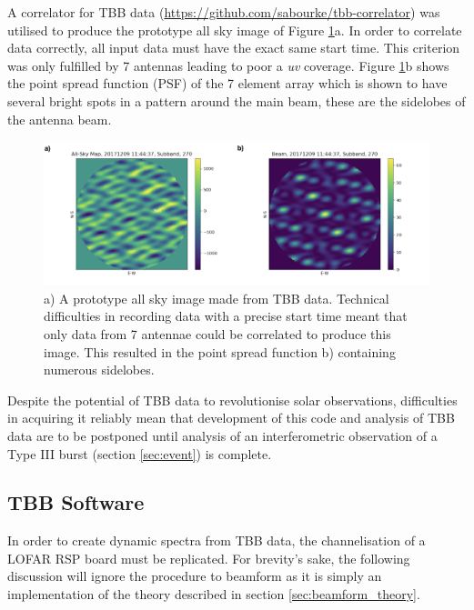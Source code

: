 A correlator for TBB data (\url{https://github.com/sabourke/tbb-correlator}) was utilised to produce the prototype all sky image of Figure \ref{fig:proto_allsky}a. In order to correlate data correctly, all input data must have the exact same start time. This criterion was only fulfilled by 7 antennas leading to poor a \textit{uv} coverage. Figure \ref{fig:proto_allsky}b shows the point spread function (PSF) of the 7 element array which is shown to have several bright spots in a pattern around the main beam, these are the sidelobes of the antenna beam.
\begin{figure}
    \centering
    \includegraphics[width=\columnwidth]{Images/AllSky_psf.png}
    \caption[Prototype TBB all sky image]{a) A prototype all sky image made from TBB data. Technical difficulties in recording data with a precise start time meant that only data from 7 antennae could be correlated to produce this image. This resulted in the point spread function b) containing numerous sidelobes. }
    \label{fig:proto_allsky}
\end{figure}

Despite the potential of TBB data to revolutionise solar observations, difficulties in acquiring it reliably mean that development of this code and analysis of TBB data are to be postponed until analysis of an interferometric observation of a Type III burst (section \ref{sec:event}) is complete.
\subsection{TBB Software}
\label{sec:TBB_software}
In order to create dynamic spectra from TBB data, the channelisation of a LOFAR RSP board must be replicated. For brevity's sake, the following discussion will ignore the procedure to beamform as it is simply an implementation of the theory described in section \ref{sec:beamform_theory}. 


